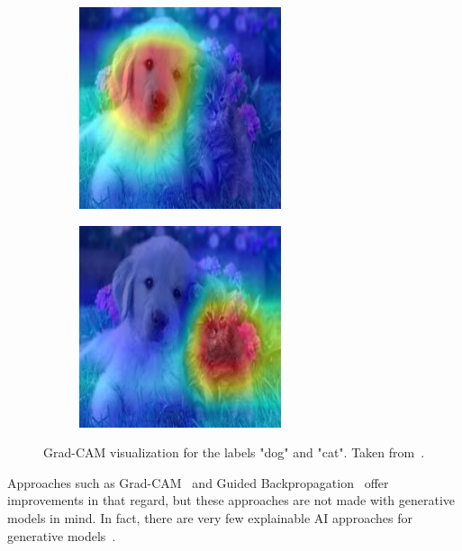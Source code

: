 \begin{figure}[H]
\begin{subfigure}{0.3\linewidth}
        \includegraphics[width=\linewidth]{resources/related_works/gradcam_dog.jpg}
    \end{subfigure}
    \hfill
    \begin{subfigure}{0.3\linewidth}
        \includegraphics[width=\linewidth]{resources/related_works/gradcam_cat.jpg}
    \end{subfigure}
    \caption[Grad-Cam Visualization]{Grad-CAM visualization for the labels "dog" and "cat". Taken from~\textcite{GradCamExample}.}
\end{figure}
Approaches such as Grad-CAM~\cite{GradCam} and Guided Backpropagation~\cite{guided_backprop} offer improvements in that regard, but these approaches are not made with generative models in mind. In fact, there are very few explainable AI approaches for generative models~\cite{XAI}.
